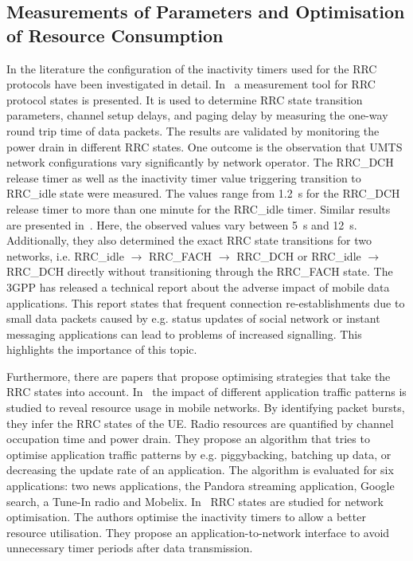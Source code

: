 \subsection{Measurements of  Parameters and Optimisation of Resource Consumption}\label{sec:network:background:measurement_optimisation}

In the literature the configuration of the inactivity timers used for the \gls{RRC} protocols have been investigated in detail.
In~\cite{Perala2009} a measurement tool for \gls{RRC} protocol states is presented.
It is used to determine \gls{RRC} state transition parameters, channel setup delays, and paging delay by measuring the one-way round trip time of data packets.
The results are validated by monitoring the power drain in different \gls{RRC} states.
One outcome is the observation that \gls{UMTS} network configurations vary significantly by network operator.
The \gls{RRC_DCH} release timer as well as the inactivity timer value triggering transition to \gls{RRC_idle} state were measured.
The values range from \SI{1.2}{\second} for the \gls{RRC_DCH} release timer to more than one minute for the \gls{RRC_idle} timer.
Similar results are presented in~\cite{Qian2010a}.
Here, the observed values vary between \SI{5}{\second} and \SI{12}{\second}.
Additionally, they also determined the exact \gls{RRC} state transitions for two networks, i.e. \gls{RRC_idle} \(\rightarrow\) \gls{RRC_FACH} \(\rightarrow\) \gls{RRC_DCH} or \gls{RRC_idle} \(\rightarrow\) \gls{RRC_DCH} directly without transitioning through the \gls{RRC_FACH} state.
The \gls{3GPP} has released a technical report \cite{3GPP_22801} about the adverse impact of mobile data applications.
This report states that frequent connection re-establishments due to small data packets caused by e.g. status updates of social network or instant messaging applications can lead to problems of increased signalling.
This highlights the importance of this topic.

Furthermore, there are papers that propose optimising strategies that take the \gls{RRC} states into account.
In~\cite{Qian2011a} the impact of different application traffic patterns is studied to reveal resource usage in mobile networks.
By identifying packet bursts, they infer the \gls{RRC} states of the \gls{UE}.
Radio resources are quantified by channel occupation time and power drain.
They propose an algorithm that tries to optimise application traffic patterns by e.g. piggybacking, batching up data, or decreasing the update rate of an application.
The algorithm is evaluated for six applications: two news applications, the Pandora streaming application, Google search, a Tune-In radio and Mobelix.
In~\cite{Qian2010b} \gls{RRC} states are studied for network optimisation.
The authors optimise the inactivity timers to allow a better resource utilisation.
They propose an application-to-network interface to avoid unnecessary timer periods after data transmission.

